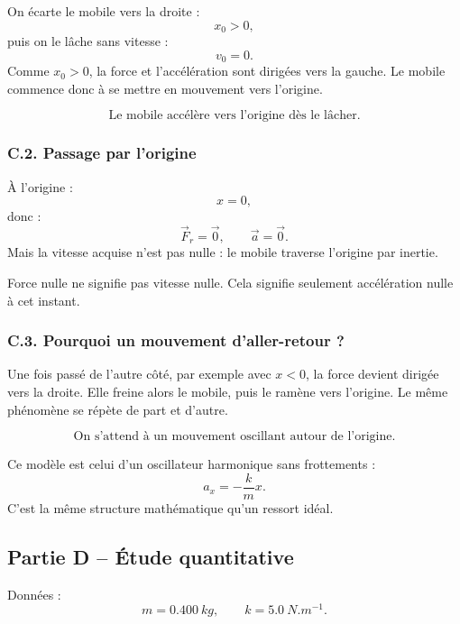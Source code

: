 \documentclass[11pt,a4paper]{article}
\begin{document}
On écarte le mobile vers la droite :
\[
x_0>0,
\]
puis on le lâche sans vitesse :
\[
v_0=0.
\]
Comme $x_0>0$, la force et l'accélération sont dirigées vers la gauche.
Le mobile commence donc à se mettre en mouvement vers l'origine.

\begin{resultatbox}
\[
\boxed{\text{Le mobile accélère vers l'origine dès le lâcher.}}
\]
\end{resultatbox}

\subsubsection*{C.2. Passage par l'origine}

À l'origine :
\[
x=0,
\]
donc :
\[
\vec F_r=\vec 0,
\qquad
\vec a=\vec 0.
\]
Mais la vitesse acquise n'est pas nulle : le mobile traverse l'origine par inertie.

\begin{attentionbox}
Force nulle ne signifie pas vitesse nulle. Cela signifie seulement accélération nulle à cet instant.
\end{attentionbox}

\subsubsection*{C.3. Pourquoi un mouvement d'aller-retour ?}

Une fois passé de l'autre côté, par exemple avec $x<0$, la force devient dirigée vers la droite.
Elle freine alors le mobile, puis le ramène vers l'origine.
Le même phénomène se répète de part et d'autre.

\begin{resultatbox}
\[
\boxed{\text{On s'attend à un mouvement oscillant autour de l'origine.}}
\]
\end{resultatbox}

\begin{remarquebox}
Ce modèle est celui d'un oscillateur harmonique sans frottements :
\[
a_x=-\frac{k}{m}x.
\]
C'est la même structure mathématique qu'un ressort idéal.
\end{remarquebox}

\subsection{Partie D -- Étude quantitative}

Données :
\[
m=\SI{0.400}{kg},\qquad k=\SI{5.0}{N.m^{-1}}.
\]
\end{document}
